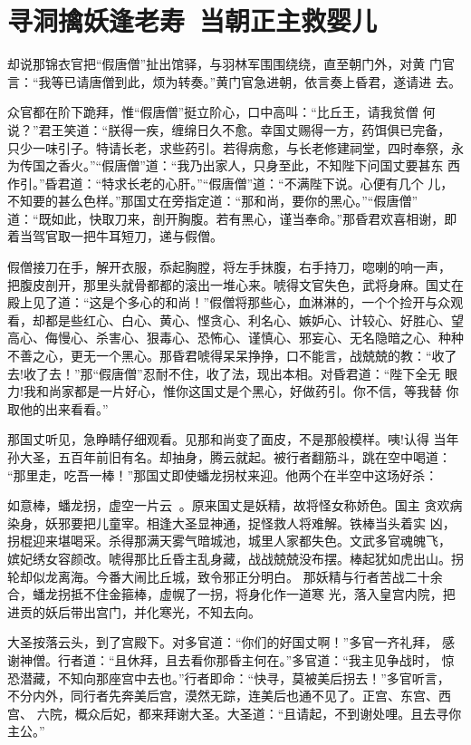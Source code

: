 \chapter{寻洞擒妖逢老寿~当朝正主救婴儿}

却说那锦衣官把“假唐僧”扯出馆驿，与羽林军围围绕绕，直至朝门外，对黄
门官言：“我等已请唐僧到此，烦为转奏。”黄门官急进朝，依言奏上昏君，遂请进
去。

众官都在阶下跪拜，惟“假唐僧”挺立阶心，口中高叫：“比丘王，请我贫僧
何说？”君王笑道：“朕得一疾，缠绵日久不愈。幸国丈赐得一方，药饵俱已完备，
只少一味引子。特请长老，求些药引。若得病愈，与长老修建祠堂，四时奉祭，永
为传国之香火。”“假唐僧”道：“我乃出家人，只身至此，不知陛下问国丈要甚东
西作引。”昏君道：“特求长老的心肝。”“假唐僧”道：“不满陛下说。心便有几个
儿，不知要的甚么色样。”那国丈在旁指定道：“那和尚，要你的黑心。”“假唐僧”
道：“既如此，快取刀来，剖开胸腹。若有黑心，谨当奉命。”那昏君欢喜相谢，即
着当驾官取一把牛耳短刀，递与假僧。

假僧接刀在手，解开衣服，忝起胸膛，将左手抹腹，右手持刀，唿喇的响一声，
把腹皮剖开，那里头就骨都都的滚出一堆心来。唬得文官失色，武将身麻。国丈在
殿上见了道：“这是个多心的和尚！”假僧将那些心，血淋淋的，一个个捡开与众观
看，却都是些红心、白心、黄心、悭贪心、利名心、嫉妒心、计较心、好胜心、望
高心、侮慢心、杀害心、狠毒心、恐怖心、谨慎心、邪妄心、无名隐暗之心、种种
不善之心，更无一个黑心。那昏君唬得呆呆挣挣，口不能言，战兢兢的教：“收了
去!收了去！”那“假唐僧”忍耐不住，收了法，现出本相。对昏君道：“陛下全无
眼力!我和尚家都是一片好心，惟你这国丈是个黑心，好做药引。你不信，等我替
你取他的出来看看。”

那国丈听见，急睁睛仔细观看。见那和尚变了面皮，不是那般模样。咦!认得
当年孙大圣，五百年前旧有名。却抽身，腾云就起。被行者翻筋斗，跳在空中喝道：
“那里走，吃吾一棒！”那国丈即使蟠龙拐杖来迎。他两个在半空中这场好杀：

如意棒，蟠龙拐，虚空一片云。原来国丈是妖精，故将怪女称娇色。国主
贪欢病染身，妖邪要把儿童宰。相逢大圣显神通，捉怪救人将难解。铁棒当头着实
凶，拐棍迎来堪喝采。杀得那满天雾气暗城池，城里人家都失色。文武多官魂魄飞，
嫔妃绣女容颜改。唬得那比丘昏主乱身藏，战战兢兢没布摆。棒起犹如虎出山。拐
轮却似龙离海。今番大闹比丘城，致令邪正分明白。
那妖精与行者苦战二十余合，蟠龙拐抵不住金箍棒，虚幌了一拐，将身化作一道寒
光，落入皇宫内院，把进贡的妖后带出宫门，并化寒光，不知去向。

大圣按落云头，到了宫殿下。对多官道：“你们的好国丈啊！”多官一齐礼拜，
感谢神僧。行者道：“且休拜，且去看你那昏主何在。”多官道：“我主见争战时，
惊恐潜藏，不知向那座宫中去也。”行者即命：“快寻，莫被美后拐去！”多官听言，
不分内外，同行者先奔美后宫，漠然无踪，连美后也通不见了。正宫、东宫、西宫、
六院，概众后妃，都来拜谢大圣。大圣道：“且请起，不到谢处哩。且去寻你主公。”

